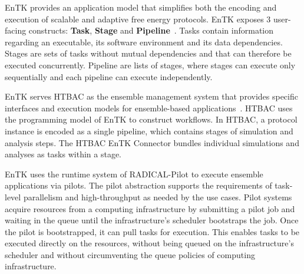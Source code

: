 EnTK provides an application model that simplifies both the encoding and
execution of scalable and adaptive free energy protocols. EnTK exposes 3
user-facing constructs: \textbf{Task}, \textbf{Stage} and
\textbf{Pipeline}~\cite{power-of-many17}. Tasks contain information regarding
an executable, its software environment and its data dependencies. Stages are
sets of tasks without mutual dependencies and that can therefore be executed
concurrently. Pipeline are lists of stages, where stages can execute only
sequentially and each pipeline can execute independently.

EnTK serves HTBAC as the ensemble management system that provides specific
interfaces and execution models for ensemble-based
applications~\cite{power-of-many17}. HTBAC uses the programming model of EnTK
to construct workflows. In HTBAC, a protocol instance is encoded as a single
pipeline, which contains stages of simulation and analysis steps. The HTBAC
EnTK Connector bundles individual simulations and analyses as tasks within a
stage. 

EnTK uses the runtime system of RADICAL-Pilot to execute ensemble
applications via pilots. The pilot abstraction supports the requirements of
task-level parallelism and high-throughput as needed by the use cases. Pilot
systems acquire resources from a computing infrastructure by submitting a
pilot job and waiting in the queue until the infrastructure's scheduler
bootstraps the job. Once the pilot is bootstrapped, it can pull tasks for
execution. This enables tasks to be executed directly on the resources,
without being queued on the infrastructure's scheduler and without
circumventing the queue policies of computing infrastructure.






